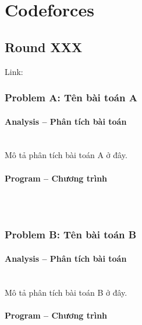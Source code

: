 \documentclass{article}
\begin{document}
\section{Codeforces}

\subsection{Round XXX}

Link: \url{}

\subsubsection{Problem A: Tên bài toán A}

\paragraph{Analysis -- Phân tích bài toán} \mbox{} \\

Mô tả phân tích bài toán A ở đây.

\paragraph{Program -- Chương trình} \mbox{} \\

\begin{lstlisting}

\end{lstlisting}

\subsubsection{Problem B: Tên bài toán B}

\paragraph{Analysis -- Phân tích bài toán} \mbox{} \\

Mô tả phân tích bài toán B ở đây.

\paragraph{Program -- Chương trình} \mbox{} \\

\begin{lstlisting}

\end{lstlisting}
\end{document}
